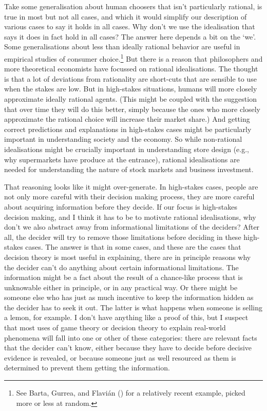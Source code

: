 \documentclass[
  12pt,
  letterpaper,
  DIV=11,
  numbers=noendperiod]{scrreprt}
\begin{document}
Take some generalisation about human choosers that isn't particularly
rational, is true in most but not all cases, and which it would simplify
our description of various cases to say it holds in all cases. Why don't
we use the idealisation that says it does in fact hold in all cases? The
answer here depends a bit on the `we'. Some generalisations about less
than ideally rational behavior are useful in empirical studies of
consumer choice.\footnote{See Barta, Gurrea, and Flavián
  () for a relatively recent example,
  picked more or less at random.} But there is a reason that
philosophers and more theoretical economists have focussed on rational
idealisations. The thought is that a lot of deviations from rationality
are short-cuts that are sensible to use when the stakes are low. But in
high-stakes situations, humans will more closely approximate ideally
rational agents. (This might be coupled with the suggestion that over
time they will do this better, simply because the ones who more closely
approximate the rational choice will increase their market share.) And
getting correct predictions and explanations in high-stakes cases might
be particularly important in understanding society and the economy. So
while non-rational idealisations might be crucially important in
understanding store design (e.g., why supermarkets have produce at the
entrance), rational idealisations are needed for understanding the
nature of stock markets and business investment.

That reasoning looks like it might over-generate. In high-stakes cases,
people are not only more careful with their decision making process,
they are more careful about acquiring information before they decide. If
our focus is high-stakes decision making, and I think it has to be to
motivate rational idealisations, why don't we also abstract away from
informational limitations of the deciders? After all, the decider will
try to remove those limitations before deciding in these high-stakes
cases. The answer is that in some cases, and these are the cases that
decision theory is most useful in explaining, there are in principle
reasons why the decider can't do anything about certain informational
limitations. The information might be a fact about the result of a
chance-like process that is unknowable either in principle, or in any
practical way. Or there might be someone else who has just as much
incentive to keep the information hidden as the decider has to seek it
out. The latter is what happens when someone is selling a lemon, for
example. I don't have anything like a proof of this, but I suspect that
most uses of game theory or decision theory to explain real-world
phenomena will fall into one or other of these categories: there are
relevant facts that the decider can't know, either because they have to
decide before decisive evidence is revealed, or because someone just as
well resourced as them is determined to prevent them getting the
information.
\end{document}
